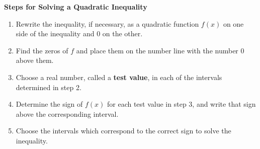 \colorbox{ResultColor}{\bbm

\centerline{\textbf{Steps for Solving a Quadratic Inequality}}  

\begin{enumerate}

\item  Rewrite the inequality, if necessary, as a quadratic function $f(x)$ on one side of the inequality and $0$ on the other.

\item  Find the zeros of $f$ and place them on the number line with the number $0$ above them.

\item  Choose a real number, called a \textbf{test value}, in each of the intervals determined in step 2. 

\item  Determine the sign of $f(x)$ for each test value in step 3, and write that sign above the corresponding interval.

\item  Choose the intervals which correspond to the correct sign to solve the inequality.

\end{enumerate}

\ebm}

\smallskip


